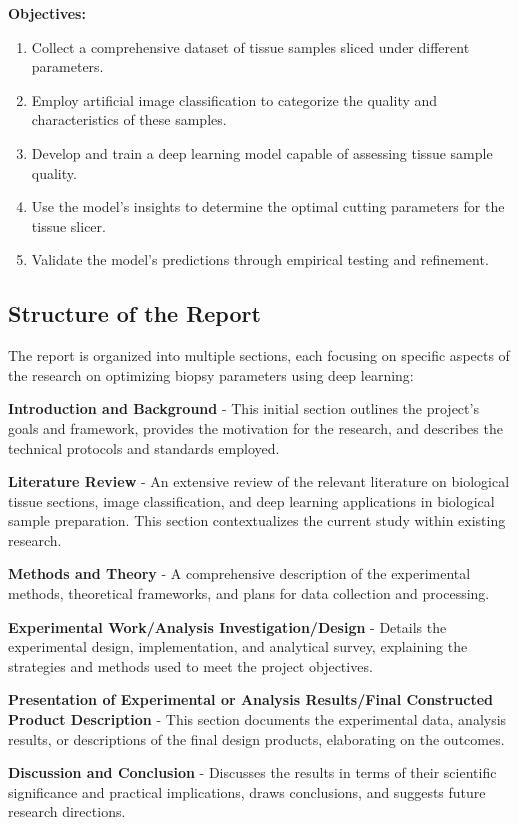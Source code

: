 \textbf{Objectives:}

\begin{enumerate}
    \item Collect a comprehensive dataset of tissue samples sliced under different parameters.
    \item Employ artificial image classification to categorize the quality and characteristics of these samples.
    \item Develop and train a deep learning model capable of assessing tissue sample quality.
    \item Use the model's insights to determine the optimal cutting parameters for the tissue slicer.
    \item Validate the model's predictions through empirical testing and refinement.
\end{enumerate}


\subsection{Structure of the Report}
The report is organized into multiple sections, each focusing on specific aspects of the research on optimizing biopsy parameters using deep learning:

\textbf{Introduction and Background} - This initial section outlines the project's goals and framework, provides the motivation for the research, and describes the technical protocols and standards employed.

\textbf{Literature Review} - An extensive review of the relevant literature on biological tissue sections, image classification, and deep learning applications in biological sample preparation. This section contextualizes the current study within existing research.

\textbf{Methods and Theory} - A comprehensive description of the experimental methods, theoretical frameworks, and plans for data collection and processing.

\textbf{Experimental Work/Analysis Investigation/Design} - Details the experimental design, implementation, and analytical survey, explaining the strategies and methods used to meet the project objectives.

\textbf{Presentation of Experimental or Analysis Results/Final Constructed Product Description} - This section documents the experimental data, analysis results, or descriptions of the final design products, elaborating on the outcomes.

\textbf{Discussion and Conclusion} - Discusses the results in terms of their scientific significance and practical implications, draws conclusions, and suggests future research directions.

